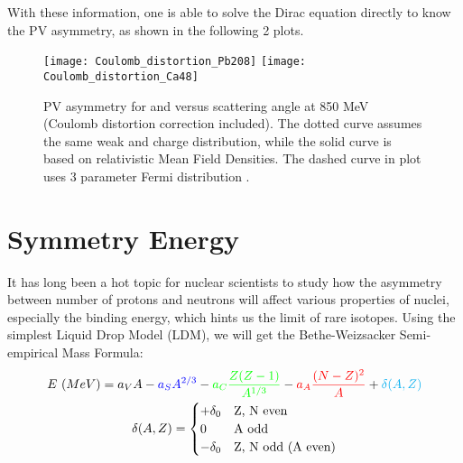 With these information, one is able to solve the Dirac equation directly to know
the PV asymmetry, as shown in the following 2 plots.

\begin{figure}[H]
    \texttt{[image: Coulomb\_distortion\_Pb208]}
    \texttt{[image: Coulomb\_distortion\_Ca48]}
    \caption{PV asymmetry for \Pb and \Ca versus scattering angle at 850 MeV 
    (Coulomb distortion correction included). 
    The dotted curve assumes the same weak and charge distribution, 
    while the solid curve is based on relativistic Mean Field Densities. The
    dashed curve in \Pb plot uses 3 parameter Fermi distribution \cite{PhysRevC.57.3430}.
    }
    \label{fig:Coulomb_distortion}
\end{figure}

\section{Symmetry Energy} 
It has long been a hot topic for nuclear scientists to study how the asymmetry 
between number of protons and neutrons will affect various properties of nuclei, 
especially the binding energy, which hints us the limit of rare isotopes. Using the simplest 
Liquid Drop Model (LDM), we will get the Bethe-Weizsacker Semi-empirical Mass Formula:
\begin{equation}
    \begin{gathered}
	E\ (MeV) = \textcolor{black}{a_V A} 
	    - \textcolor{blue}{a_S A^{2/3}} 
	    - \textcolor{green}{a_C\frac{Z(Z-1)}{A^{1/3}}} 
	    - \textcolor{red}{a_A\frac{(N-Z)^2}{A}} 
	    + \textcolor{cyan}{\delta(A, Z)} \\
	\delta(A, Z) = 
	    \begin{cases}
		+\delta_0	& \text{Z, N even} \\
		0		& \text{A odd}	\\
		-\delta_0	& \text{Z, N odd (A even)} \\
	    \end{cases}
    \end{gathered}
    \label{eq:mass-formula}
\end{equation}

